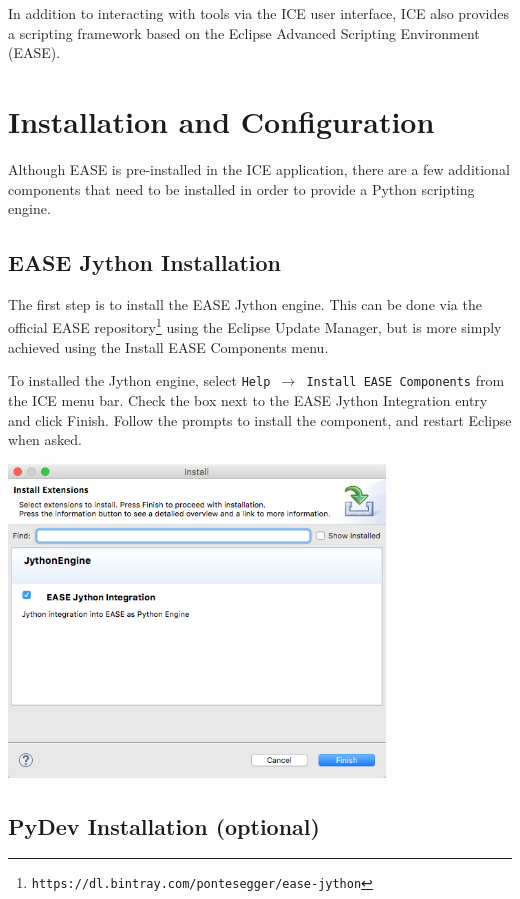 
In addition to interacting with tools via the ICE user interface, ICE also
provides a scripting framework based on the Eclipse Advanced Scripting
Environment (EASE). 

\section{Installation and Configuration}

Although EASE is pre-installed in the ICE application, there are a few
additional components that need to be installed in order to provide a Python
scripting engine.

\subsection{EASE Jython Installation} 

The first step is to install the EASE Jython engine. This can be done via the
official EASE
repository\footnote{\texttt{https://dl.bintray.com/pontesegger/ease-jython}}
using the Eclipse Update Manager, but is more simply achieved using the Install EASE Components menu.

To installed the Jython engine, select \texttt{Help $\rightarrow$ Install
EASE Components} from the ICE menu bar. Check the box next to the EASE Jython
Integration entry and click Finish. Follow the prompts to install the component,
and restart Eclipse when asked.
\begin{center}
\includegraphics[width=10cm]{images/ease-marketplace}
\end{center}

\subsection{PyDev Installation (optional)} 

